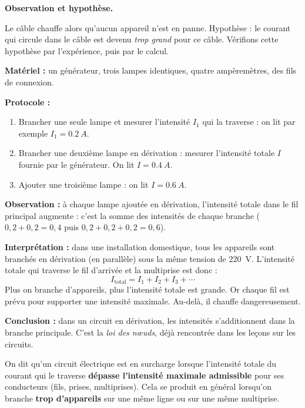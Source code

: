 \documentclass[11pt]{article}
\newcommand{\cle}[1]{{\popxbold\color{popdark}#1}}
\begin{document}
\textbf{Observation et hypothèse.}\par
Le câble chauffe alors qu'aucun appareil n'est en panne. Hypothèse : le courant qui circule dans le câble est devenu \emph{trop grand} pour ce câble. Vérifions cette hypothèse par l'expérience, puis par le calcul.

\begin{experience}
\textbf{Matériel :} un générateur, trois lampes identiques, quatre ampèremètres, des fils de connexion.

\textbf{Protocole :}
\begin{enumerate}
\item Brancher une seule lampe et mesurer l'intensité $I_1$ qui la traverse : on lit par exemple $I_1 = \SI{0,2}{A}$.
\item Brancher une deuxième lampe en dérivation : mesurer l'intensité totale $I$ fournie par le générateur. On lit $I = \SI{0,4}{A}$.
\item Ajouter une troisième lampe : on lit $I = \SI{0,6}{A}$.
\end{enumerate}

\textbf{Observation :} à chaque lampe ajoutée en dérivation, l'intensité totale dans le fil principal augmente : c'est la somme des intensités de chaque branche ($0,2 + 0,2 = 0,4$ puis $0,2 + 0,2 + 0,2 = 0,6$).

\textbf{Interprétation :} dans une installation domestique, tous les appareils sont branchés en dérivation (en parallèle) sous la même tension de \SI{220}{V}. L'intensité totale qui traverse le fil d'arrivée et la multiprise est donc :
\[ I_{\text{total}} = I_1 + I_2 + I_3 + \cdots \]
Plus on branche d'appareils, plus l'intensité totale est grande. Or chaque fil est prévu pour supporter une intensité maximale. Au-delà, il chauffe dangereusement.

\textbf{Conclusion :} dans un circuit en dérivation, les intensités s'additionnent dans la branche principale. C'est la \emph{loi des nœuds}, déjà rencontrée dans les leçons sur les circuits.
\end{experience}

\begin{definition}[Surcharge]
On dit qu'un circuit électrique est en \cle{surcharge} lorsque l'intensité totale du courant qui le traverse \textbf{dépasse l'intensité maximale admissible} pour ses conducteurs (fils, prises, multiprises). Cela se produit en général lorsqu'on branche \textbf{trop d'appareils} sur une même ligne ou sur une même multiprise.
\end{definition}
\end{document}
